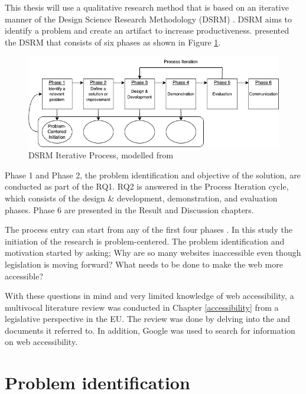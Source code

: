 This thesis will use a qualitative research method that is based on an iterative manner of the Design Science Research Methodology (DSRM) \citep{designsciencemethodology, iterativedesignscience}. DSRM aims to identify a problem and create an artifact to increase productiveness. \textcite{iterativedesignscience} presented the DSRM that consists of six phases as shown in Figure \ref{fig:design-science}.

\begin{figure}
    \centering
    \includegraphics[width=1\linewidth]{DSRM.png}
    \caption{DSRM Iterative Process, modelled from \textcite{iterativedesignscience}}
    \label{fig:design-science}
\end{figure}

Phase 1 and Phase 2, the problem identification and objective of the solution, are conducted as part of the RQ1. RQ2 is answered in the Process Iteration cycle, which consists of the design \& development, demonstration, and evaluation phases. Phase 6 are presented in the Result and Discussion chapters.

The process entry can start from any of the first four phases \citep{iterativedesignscience}. In this study the initiation of the research is problem-centered. The problem identification and motivation started by asking; Why are so many websites inaccessible even though legislation is moving forward? What needs to be done to make the web more accessible? 

With these questions in mind and very limited knowledge of web accessibility, a multivocal literature review was conducted in Chapter \ref{accessibility} from a legislative perspective in the EU. The review was done by delving into the \textcite{eudirective2016} and documents it referred to. In addition, Google was used to search for information on web accessibility.

\section{Problem identification}

